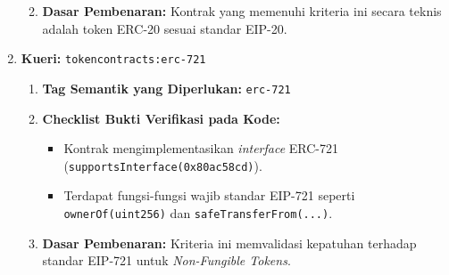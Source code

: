 \begin{enumerate}
\begin{enumerate}
\begin{itemize}
        \end{itemize}
        \item \textbf{Dasar Pembenaran:} Kontrak yang memenuhi kriteria ini secara teknis adalah token ERC-20 sesuai standar EIP-20.
    \end{enumerate}
    \item \textbf{Kueri:} \texttt{token\textunderscore contracts:erc-721}
    \begin{enumerate}
        \item \textbf{Tag Semantik yang Diperlukan:} \texttt{erc-721}
        \item \textbf{Checklist Bukti Verifikasi pada Kode:}
        \begin{itemize}
            \item Kontrak mengimplementasikan \textit{interface} ERC-721 \\(\texttt{supportsInterface(0x80ac58cd)}).
            \item Terdapat fungsi-fungsi wajib standar EIP-721 seperti \\\texttt{ownerOf(uint256)} dan \texttt{safeTransferFrom(...)}.
        \end{itemize}
        \item \textbf{Dasar Pembenaran:} Kriteria ini memvalidasi kepatuhan terhadap standar EIP-721 untuk \textit{Non-Fungible Tokens}.
    \end{enumerate}
\end{enumerate}

